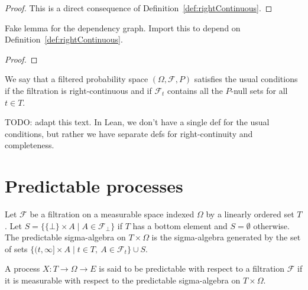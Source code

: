 \begin{proof}\mathlibok
This is a direct consequence of Definition~\ref{def:rightContinuous}.
\end{proof}

\begin{lemma}\label{lem:rightContinuous_basic}
  \leanok
Fake lemma for the dependency graph. Import this to depend on Definition~\ref{def:rightContinuous}.
\end{lemma}

\begin{proof}\leanok

\end{proof}


\begin{definition}\label{def:hasUsualConditions}
  \mathlibok
We say that a filtered probability space $(\Omega, \mathcal{F}, P)$ satisfies the usual conditions if the filtration is right-continuous and if $\mathcal{F}_t$ contains all the $P$-null sets for all $t \in T$.
\end{definition}

TODO: adapt this text. In Lean, we don't have a single def for the usual conditions, but rather we have separate defs for right-continuity and completeness.




\section{Predictable processes}


\begin{definition}\label{def:predictableMeasurableSpace}
  \mathlibok
Let $\mathcal{F}$ be a filtration on a measurable space indexed $\Omega$ by a linearly ordered set $T$.
Let $S = \{\{\bot\} \times A \mid A \in \mathcal{F}_\bot\}$ if $T$ has a bottom element and $S = \emptyset$ otherwise.
The predictable sigma-algebra on $T \times \Omega$ is the sigma-algebra generated by the set of sets $\{(t, \infty] \times A \mid t \in T, \: A \in \mathcal{F}_t\} \cup S$.
\end{definition}


\begin{definition}\label{def:predictable}
  \mathlibok
A process $X : T \to \Omega \to E$ is said to be predictable with respect to a filtration $\mathcal{F}$ if it is measurable with respect to the predictable sigma-algebra on $T \times \Omega$.
\end{definition}


